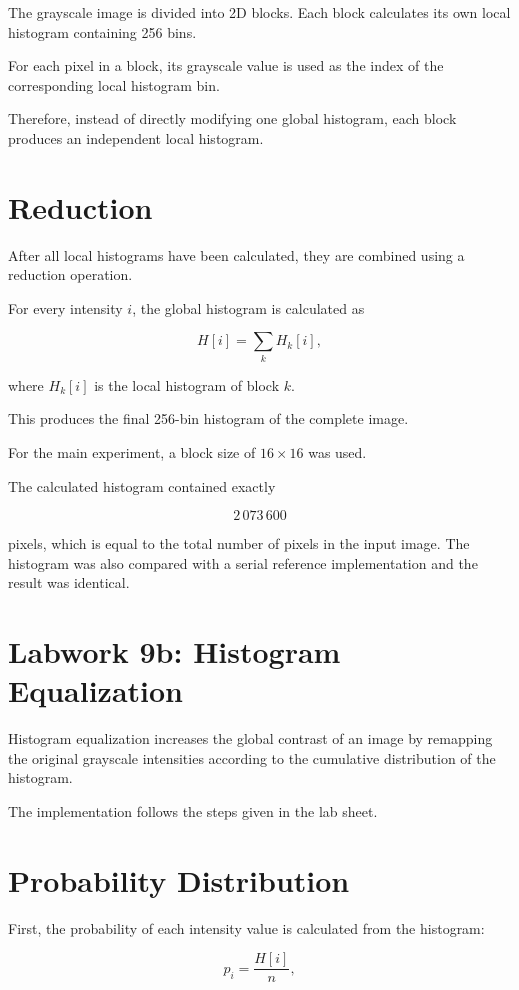 \documentclass[11pt]{article}
\begin{document}
The grayscale image is divided into 2D blocks. Each block calculates its
own local histogram containing 256 bins.

For each pixel in a block, its grayscale value is used as the index of the
corresponding local histogram bin.

Therefore, instead of directly modifying one global histogram, each block
produces an independent local histogram.

\section{Reduction}

After all local histograms have been calculated, they are combined using a
reduction operation.

For every intensity $i$, the global histogram is calculated as

\[
H[i] = \sum_k H_k[i],
\]

where $H_k[i]$ is the local histogram of block $k$.

This produces the final 256-bin histogram of the complete image.

For the main experiment, a block size of $16 \times 16$ was used.

The calculated histogram contained exactly

\[
2\,073\,600
\]

pixels, which is equal to the total number of pixels in the input image.
The histogram was also compared with a serial reference implementation and
the result was identical.

\section{Labwork 9b: Histogram Equalization}

Histogram equalization increases the global contrast of an image by
remapping the original grayscale intensities according to the cumulative
distribution of the histogram.

The implementation follows the steps given in the lab sheet.

\section{Probability Distribution}

First, the probability of each intensity value is calculated from the
histogram:

\[
p_i = \frac{H[i]}{n},
\]
\end{document}
